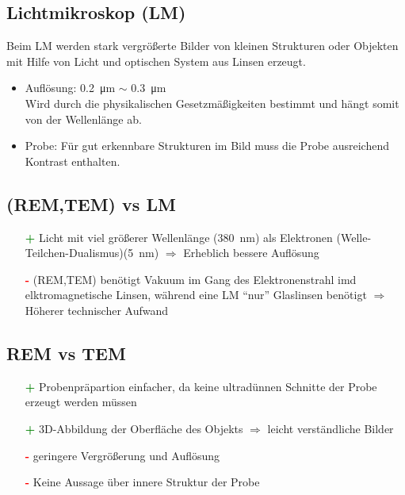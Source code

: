 \subsection*{Lichtmikroskop (LM)}
Beim LM werden stark vergrößerte Bilder von kleinen Strukturen oder Objekten mit Hilfe von Licht und optischen System aus Linsen erzeugt.
\begin{itemize}
    \item Auflösung: \SI{0,2}{\micro\metre} $\sim$ \SI{0,3}{\micro\metre}\\
    Wird durch die physikalischen Gesetzmäßigkeiten bestimmt und hängt somit von der Wellenlänge ab. 
    \item Probe: Für gut erkennbare Strukturen im Bild muss die Probe ausreichend Kontrast enthalten. \citep{WikiLM}
\end{itemize}

\subsection*{(REM,TEM) vs LM}
\begin{itemize}
    \item[\textcolor{green}{\textbf{+}}] Licht mit viel größerer Wellenlänge (\SI{380}{\nano\metre}) als Elektronen (Welle-Teilchen-Dualismus)(\SI{5}{\nano\metre}) $\Rightarrow$ Erheblich bessere Auflösung
    \item[\textcolor{red}{\textbf{-}}] (REM,TEM) benötigt Vakuum im Gang des Elektronenstrahl imd elktromagnetische Linsen, während eine LM \enquote{nur} Glaslinsen benötigt $\Rightarrow$ Höherer technischer Aufwand \citep{RuppelEM}
\end{itemize}

\subsection*{REM vs TEM}
\begin{itemize}
    \item[\textcolor{green}{\textbf{+}}] Probenpräpartion einfacher, da keine ultradünnen Schnitte der Probe erzeugt werden müssen
    \item[\textcolor{green}{\textbf{+}}] 3D-Abbildung der Oberfläche des Objekts $\Rightarrow$ leicht verständliche Bilder 
    \item[\textcolor{red}{\textbf{-}}] geringere Vergrößerung und Auflösung
    \item[\textcolor{red}{\textbf{-}}] Keine Aussage über innere Struktur der Probe \citep{RuppelEM} 
\end{itemize}

